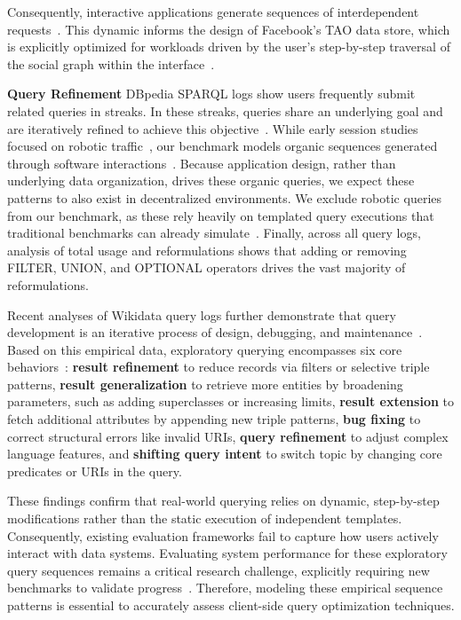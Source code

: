 Consequently, interactive applications generate sequences of interdependent requests~\cite{vogele2018wessbas}. 
This dynamic informs the design of Facebook's TAO data store, 
which is explicitly optimized for workloads driven by the user's step-by-step traversal of the social graph within the interface~\cite{bronson2013tao}.

\textbf{Query Refinement}  
DBpedia SPARQL logs show users frequently submit related queries in streaks. 
In these streaks, queries share an underlying goal 
and are iteratively refined to achieve this objective~\cite{bonifati2020analytical,zhang2020characterizing}. 
While early session studies focused on robotic traffic~\cite{zhang2020characterizing,bonifati2020analytical}, 
our benchmark models organic sequences generated through software interactions~\cite{zhang2020characterizing,malyshev2018getting}. 
Because application design, rather than underlying data organization, drives these organic queries, 
we expect these patterns to also exist in decentralized environments. 
We exclude robotic queries from our benchmark, 
as these rely heavily on templated query executions that traditional benchmarks can already simulate~\cite{taelman2023link,bizer2011berlin,alucc2014diversified}. 
Finally, across all query logs, analysis of total usage and reformulations shows that 
adding or removing FILTER, UNION, and OPTIONAL operators drives the vast majority of reformulations.

Recent analyses of Wikidata query logs further demonstrate that query development is an iterative process of design,
debugging, and maintenance~\cite{arenas2025exploring}.
Based on this empirical data, 
exploratory querying encompasses six core behaviors~\cite{arenas2025exploring}:
\textbf{result refinement} to reduce records via filters or selective triple patterns,
\textbf{result generalization} to retrieve more entities by broadening parameters,
such as adding superclasses or increasing limits,
\textbf{result extension} to fetch additional attributes by appending new triple patterns,
\textbf{bug fixing} to correct structural errors like invalid URIs,
\textbf{query refinement} to adjust complex language features,
and \textbf{shifting query intent} to switch topic by changing core predicates or URIs in the query.

These findings confirm that real-world querying relies on dynamic, step-by-step modifications rather than the static execution of independent templates.
Consequently, existing evaluation frameworks fail to capture how users actively interact with data systems. 
Evaluating system performance for these exploratory query sequences remains a critical research challenge, 
explicitly requiring new benchmarks to validate progress~\cite{arenas2025exploring}. 
Therefore, modeling these empirical sequence patterns is essential to accurately assess client-side 
query optimization techniques.